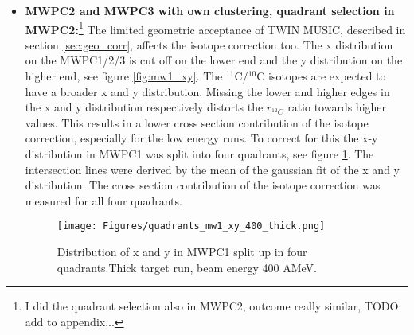 \begin{itemize}
\item \textbf{MWPC2 and MWPC3 with own clustering, quadrant selection in MWPC2:}\footnote{I did the quadrant selection also in MWPC2, outcome really similar, TODO: add to appendix...}\newline
The limited geometric acceptance of TWIN MUSIC, described in section \ref{sec:geo_corr}, affects the isotope correction too. The x distribution on the MWPC1/2/3 is cut off on the lower end and the y distribution on the higher end, see figure \ref{fig:mw1_xy}. The $^{11}$C/$^{10}$C isotopes are expected to have a broader x and y distribution. Missing the lower and higher edges in the x and y distribution respectively distorts the ${r_{^{12}C}}$ ratio towards higher values. This results in a lower cross section contribution of the isotope correction, especially for the low energy runs. To correct for this the x-y distribution in MWPC1 was split into four quadrants, see figure \ref{fig:mw1_xy_quadrants}. The intersection lines were derived by the mean of the gaussian fit of the x and y distribution. The cross section contribution of the isotope correction was measured for all four quadrants.
\begin{figure}[htpb]
    \centering
    \texttt{[image: Figures/quadrants\_mw1\_xy\_400\_thick.png]}
    \caption{
   	 Distribution of x and y in MWPC1 split up in four quadrants.Thick target run, beam energy 400 AMeV. 
     }
    \label{fig:mw1_xy_quadrants}
\end{figure}
\end{itemize}
\newpage

